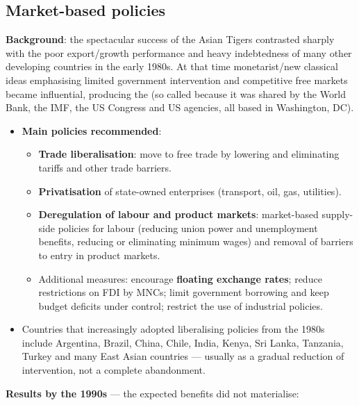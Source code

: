 \subsection{Market-based policies}
\textbf{Background}: the spectacular success of the Asian Tigers contrasted sharply with the poor export/growth performance and heavy indebtedness of many other developing countries in the early 1980s. At that time monetarist/new classical ideas emphasising limited government intervention and competitive free markets became influential, producing the  (so called because it was shared by the World Bank, the IMF, the US Congress and US agencies, all based in Washington, DC).
\begin{itemize}
  \item \textbf{Main policies recommended}:
  \begin{itemize}
    \item \textbf{Trade liberalisation}: move to free trade by lowering and eliminating tariffs and other trade barriers.
    \item \textbf{Privatisation} of state-owned enterprises (transport, oil, gas, utilities).
    \item \textbf{Deregulation of labour and product markets}: market-based supply-side policies for labour (reducing union power and unemployment benefits, reducing or eliminating minimum wages) and removal of barriers to entry in product markets.
    \item Additional measures: encourage \textbf{floating exchange rates}; reduce restrictions on FDI by MNCs; limit government borrowing and keep budget deficits under control; restrict the use of industrial policies.
  \end{itemize}
  \item Countries that increasingly adopted liberalising policies from the 1980s include Argentina, Brazil, China, Chile, India, Kenya, Sri Lanka, Tanzania, Turkey and many East Asian countries --- usually as a gradual reduction of intervention, not a complete abandonment.
\end{itemize}
\textbf{Results by the 1990s} --- the expected benefits did not materialise:
